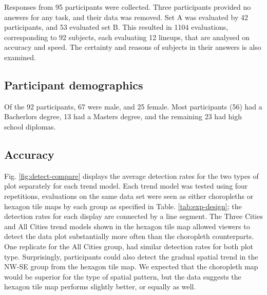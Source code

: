 \documentclass[conference,final,]{IEEEtran}
\begin{document}
Responses from 95 participants were collected. Three participants provided no answers for any task, and their data was removed. Set A was evaluated by 42 participants, and 53 evaluated set B. This resulted in 1104 evaluations, corresponding to 92 subjects, each evaluating 12 lineups, that are analysed on accuracy and speed. The certainty and reasons of subjects in their answers is also examined.

\hypertarget{participant-demographics}{%
\subsection{Participant demographics}\label{participant-demographics}}

Of the 92 participants, 67 were male, and 25 female. Most participants (56) had a Bacherlors degree, 13 had a Masters degree, and the remaining 23 had high school diplomas.

\hypertarget{accuracy}{%
\subsection{Accuracy}\label{accuracy}}

Fig. \ref{fig:detect-compare} displays the average detection rates for the two types of plot separately for each trend model. Each trend model was tested using four repetitions, evaluations on the same data set were seen as either choropleths or hexagon tile maps by each group as specified in Table. \ref{tab:exp-design}; the detection rates for each display are connected by a line segment. The Three Cities and All Cities trend models shown in the hexagon tile map allowed viewers to detect the data plot substantially more often than the choropleth counterparts. One replicate for the All Cities group, had similar detection rates for both plot type. Surprisingly, participants could also detect the gradual spatial trend in the NW-SE group from the hexagon tile map. We expected that the choropleth map would be superior for the type of spatial pattern, but the data suggests the hexagon tile map performs slightly better, or equally as well.
\end{document}
